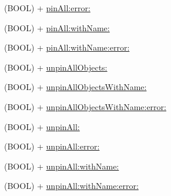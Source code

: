 \begin{DoxyCompactItemize}
\begin{DoxyCompactList}
 \end{DoxyCompactList}\item 
(B\+O\+O\+L) + \hyperlink{interface_p_f_object_a6243b032f205d831b46c537493bc39b7}{pin\+All\+:error\+:}
\item 
(B\+O\+O\+L) + \hyperlink{interface_p_f_object_ab30f02bb742052101f4f30b0ed040a1e}{pin\+All\+:with\+Name\+:}
\item 
(B\+O\+O\+L) + \hyperlink{interface_p_f_object_a2fad89c6478357f05197959283d75455}{pin\+All\+:with\+Name\+:error\+:}
\item 
(B\+O\+O\+L) + \hyperlink{interface_p_f_object_a33f9eafdd59ab82e10b47524a039c73f}{unpin\+All\+Objects\+:}
\item 
(B\+O\+O\+L) + \hyperlink{interface_p_f_object_a938bbda1e7d1af59c9939be61131a744}{unpin\+All\+Objects\+With\+Name\+:}
\item 
(B\+O\+O\+L) + \hyperlink{interface_p_f_object_abfa4f1d7765483d99d3c9fbbefa784bd}{unpin\+All\+Objects\+With\+Name\+:error\+:}
\item 
(B\+O\+O\+L) + \hyperlink{interface_p_f_object_aaccc527f6232d2d87398d6cd27f55f06}{unpin\+All\+:}
\item 
(B\+O\+O\+L) + \hyperlink{interface_p_f_object_ace10cf5be427fbcce1364e2223da527c}{unpin\+All\+:error\+:}
\item 
(B\+O\+O\+L) + \hyperlink{interface_p_f_object_a1134dbdf7ef51d9eef9e869aae08abc4}{unpin\+All\+:with\+Name\+:}
\item 
(B\+O\+O\+L) + \hyperlink{interface_p_f_object_a38758ee3650df7b75c2f5564bea0aaee}{unpin\+All\+:with\+Name\+:error\+:}
\end{DoxyCompactItemize}
